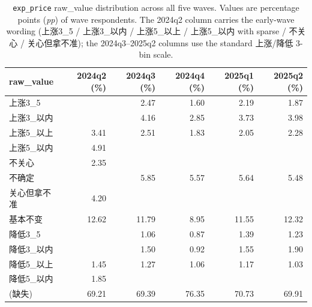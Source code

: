 \documentclass[11pt,letterpaper,english,final]{article}
\begin{document}
\begin{table}[H]
\centering
\small
\setlength{\tabcolsep}{5pt}
\caption{\texttt{exp\_price} raw\_value distribution across all five waves. Values are percentage points (\textit{pp}) of wave respondents. The 2024q2 column carries the early-wave wording (上涨3\_5 / 上涨3\_以内 / 上涨5\_以上 / 上涨5\_以内 with sparse / 不关心 / 关心但拿不准); the 2024q3--2025q2 columns use the standard 上涨/降低 3-bin scale.}
\label{tab:exp_price_dist}
\begin{tabular}{@{}l r r r r r@{}}
\toprule
{raw\_value} & {2024q2 (\%)} & {2024q3 (\%)} & {2024q4 (\%)} & {2025q1 (\%)} & {2025q2 (\%)} \\
\midrule
上涨3\_5     &       & 2.47  & 1.60  & 2.19  & 1.87  \\
上涨3\_以内  &       & 4.16  & 2.85  & 3.73  & 3.98  \\
上涨5\_以上  & 3.41  & 2.51  & 1.83  & 2.05  & 2.28  \\
上涨5\_以内  & 4.91  &       &       &       &       \\
不关心      & 2.35  &       &       &       &       \\
不确定      &       & 5.85  & 5.57  & 5.64  & 5.48  \\
关心但拿不准 & 4.20  &       &       &       &       \\
基本不变    & 12.62 & 11.79 & 8.95  & 11.55 & 12.32 \\
降低3\_5     &       & 1.06  & 0.87  & 1.39  & 1.23  \\
降低3\_以内  &       & 1.50  & 0.92  & 1.55  & 1.90  \\
降低5\_以上  & 1.45  & 1.27  & 1.06  & 1.17  & 1.03  \\
降低5\_以内  & 1.85  &       &       &       &       \\
\midrule
(缺失)        & 69.21 & 69.39 & 76.35 & 70.73 & 69.91 \\
\bottomrule
\end{tabular}
\end{table}
\end{document}
